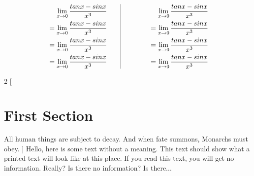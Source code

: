 \documentclass[14pt]{extarticle}
\begin{document}
\begin{equation*}
\begin{aligned}[t]
\lim_{x \to 0} \frac{tan x - sin x}{x^3} \\
\ =\lim_{x \to 0} \frac{tan x - sin x}{x^3}\\ 
\ =\lim_{x \to 0} \frac{tan x - sin x}{x^3} \\
\ =\lim_{x \to 0} \frac{tan x - sin x}{x^3} 
\end{aligned}
\qquad 
\vrule
\qquad
\begin{aligned}[t]
\end{aligned}
\qquad
\begin{aligned}[t]
\lim_{x \to 0} \frac{tan x - sin x}{x^3} \\
\ =\lim_{x \to 0} \frac{tan x - sin x}{x^3}\\ 
\ =\lim_{x \to 0} \frac{tan x - sin x}{x^3} \\
\ =\lim_{x \to 0} \frac{tan x - sin x}{x^3} 
\end{aligned}
\end{equation*}

\begin{multicols}{2}
[
\section{First Section}
All human things are subject to decay. And when fate summons, Monarchs must obey.
]
Hello, here is some text without a meaning.  This text should show what 
a printed text will look like at this place.
If you read this text, you will get no information.  Really?  Is there 
no information?  Is there...
\end{multicols}
\end{document}
